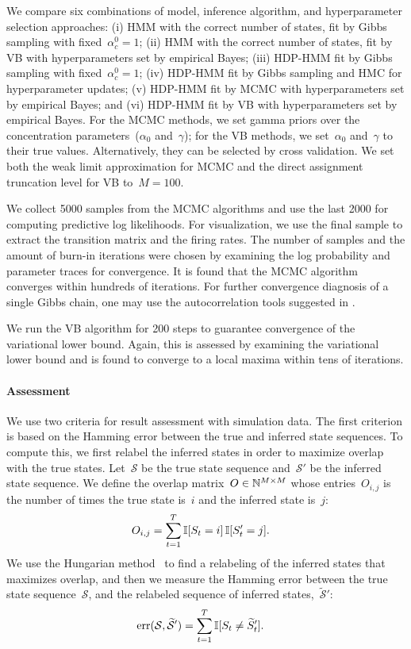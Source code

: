 We compare six combinations of model,  inference algorithm, and hyperparameter selection approaches: (i) HMM with the correct number of states, fit by Gibbs sampling with fixed~$\alpha_c^0=1$; (ii) HMM with the correct number of states, fit by VB with hyperparameters set by empirical Bayes; (iii) HDP-HMM fit by Gibbs sampling with fixed~$\alpha_c^0=1$; (iv) HDP-HMM fit by Gibbs sampling and HMC for hyperparameter updates; (v) HDP-HMM fit by MCMC with hyperparameters set by empirical Bayes; and (vi) HDP-HMM fit by VB with hyperparameters set by empirical Bayes. For the MCMC methods, we set gamma priors over the concentration parameters~($\alpha_0$ and~$\gamma$); for the VB methods, we set~$\alpha_0$ and~$\gamma$ to their true values. Alternatively, they can be selected by cross validation. We set both the weak limit approximation for MCMC and the direct assignment truncation level for VB to~${M=100}$.

We collect 5000 samples from the MCMC algorithms and use the last 2000 for computing predictive log likelihoods. For visualization, we use the final sample to extract the transition matrix and the firing rates. The number of samples and the amount of burn-in iterations were chosen by examining the log probability and parameter traces for convergence. It is found that the MCMC algorithm converges within hundreds of iterations. For further convergence diagnosis of a single Gibbs chain, one may use the autocorrelation tools suggested in \citep{RafteryLewis92,Cowles96}.

We run the VB algorithm for 200 steps to guarantee convergence of the variational lower bound. Again, this is assessed by examining the variational lower bound and is found to converge to a local maxima within tens of iterations.


\paragraph{Assessment} 

We use two criteria for result assessment with simulation data.  The first criterion is based on the Hamming error between the true and inferred state sequences. To compute this, we first relabel the inferred states in order to maximize overlap with the true states. Let~$\mathcal{S}$ be the true state sequence and~$\mathcal{S}'$ be the inferred state sequence. We define the overlap matrix~$O \in \mathbb{N}^{M \times M}$ whose entries~$O_{i,j}$ is the number of times the true state is~$i$ and the inferred state is~$j$:
\begin{align}
O_{i,j} &= \sum_{t=1}^T \mathbb{I}[S_t=i] \, \mathbb{I}[S_t'=j].
\end{align}
We use the Hungarian method~\citep{kuhn1955hungarian} to find a relabeling of the inferred states that maximizes overlap, and then we measure the Hamming error between the true state sequence~$\mathcal{S}$, and the relabeled sequence of inferred states,~$\widetilde{\mathcal{S}}'$:
\begin{align}
\label{eq:hamming}
\text{err}(\mathcal{S}, \widetilde{\mathcal{S}}') &= \sum_{t=1}^T \mathbb{I}[S_t \neq \widetilde{S}_t'].
\end{align}

